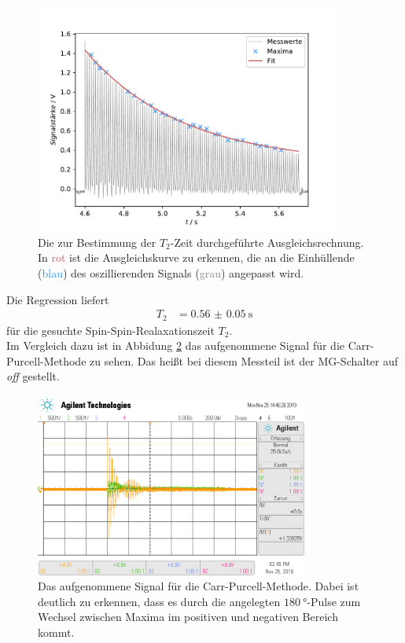 \begin{figure}[H]
  \centering
  \includegraphics[width=0.9\textwidth]{../Auswertung/T2_fit.pdf}
  \caption{Die zur Bestimmung der $T_2$-Zeit durchgeführte Ausgleichsrechnung. In \textcolor{indianred}{rot} ist die Ausgleichskurve zu erkennen,
  die an die Einhüllende (\textcolor{dodgerblue}{blau}) des oszillierenden Signals (\textcolor{gray}{grau}) angepasst wird.}
  \label{fig:T2_fit}
\end{figure} \noindent
Die Regression liefert
\begin{align*}
  T_2 &=  \SI{0.56(005)}{\second}
\end{align*}
für die gesuchte Spin-Spin-Realaxationszeit $T_2$. \\
Im Vergleich dazu ist in Abbidung \ref{fig:t2_off} das aufgenommene Signal für die Carr-Purcell-Methode zu sehen. Das heißt bei diesem
Messteil ist der MG-Schalter auf \textit{off} gestellt.
\begin{figure}[H]
  \centering
  \includegraphics[width=0.8\textwidth]{../data/scope_76.png}
  \caption{Das aufgenommene Signal für die Carr-Purcell-Methode. Dabei ist deutlich zu erkennen, dass es durch die angelegten
  $\SI{180}{\degree}$-Pulse zum Wechsel zwischen Maxima im positiven und negativen Bereich kommt.}
  \label{fig:t2_off}
\end{figure} \noindent
